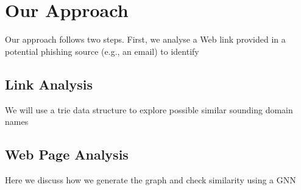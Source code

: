 \section{Our Approach} %
\label{sec:approach}

Our approach follows two steps. First, we analyse a Web link provided in a potential phishing source (e.g., an email) to identify 

\subsection{Link Analysis} %
\label{sub:approach-link-analysis}

We will use a trie data structure to explore possible similar sounding domain names


\subsection{Web Page Analysis} %
\label{sub:approach-web-page-analysis}

Here we discuss how we generate the graph and check similarity using a GNN


